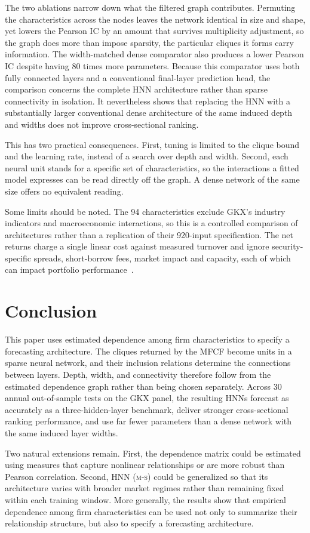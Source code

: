 \documentclass[sigconf,nonacm]{acmart}
\newcommand{\ParamRatio}{80}
\newcommand{\HNNMS}{\textsc{HNN (m-s)}}
\begin{document}
The two ablations narrow down what the filtered graph contributes. Permuting the characteristics across the nodes leaves the network
identical in size and shape, yet lowers the Pearson IC by an amount that survives multiplicity adjustment, so
the graph does more than impose sparsity, the particular cliques it forms carry
information. The width-matched dense comparator also produces a lower Pearson
IC despite having \ParamRatio{} times more parameters. Because this comparator
uses both fully connected layers and a conventional final-layer prediction head,
the comparison concerns the complete HNN architecture rather than sparse
connectivity in isolation. It nevertheless shows that replacing the HNN with a
substantially larger conventional dense architecture of the same induced depth
and widths does not improve cross-sectional ranking.

This has two practical consequences. First, tuning is limited to the clique
bound and the learning rate, instead of a search over depth and width. Second, each neural unit stands for a specific set of
characteristics, so the interactions a fitted model expresses can be read directly off the graph. A dense network of the same size offers no equivalent reading.

Some limits should be noted. The 94 characteristics exclude GKX's industry
indicators and macroeconomic interactions, so this is a controlled comparison of
architectures rather than a replication of their 920-input specification. The
net returns charge a single linear cost against measured turnover and ignore
security-specific spreads, short-borrow fees, market impact and capacity, each
of which can impact portfolio performance~\cite{avramov2023}.



\section{Conclusion}\label{con}

This paper uses estimated dependence among firm characteristics to specify a
forecasting architecture. The cliques returned by the MFCF become units in a
sparse neural network, and their inclusion relations determine the connections
between layers. Depth, width, and connectivity therefore follow from the
estimated dependence graph rather than being chosen separately. Across 30
annual out-of-sample tests on the GKX panel, the resulting HNNs forecast as accurately as a three-hidden-layer benchmark,
deliver stronger cross-sectional ranking performance, and use far fewer
parameters than a dense network with the same induced layer widths.

Two natural extensions remain. First, the dependence matrix could be estimated
using measures that capture nonlinear relationships or are more robust than
Pearson correlation. Second, \HNNMS{} could be generalized so that its
architecture varies with broader market regimes rather than remaining fixed
within each training window. More generally, the results show that empirical
dependence among firm characteristics can be used not only to summarize their
relationship structure, but also to specify a forecasting architecture.




\end{document}
